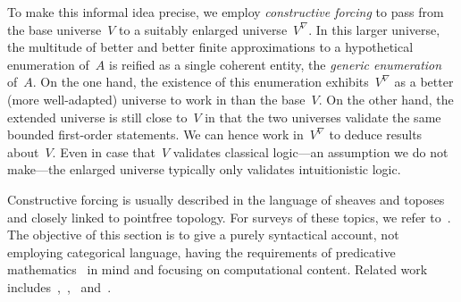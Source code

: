 \documentclass[com,11pt,crcready]{iosart2x}
\theoremstyle{definition}
\theoremstyle{plain}
\theoremstyle{remark}
\renewcommand{\_}{\mathpunct{.}\,}
\begin{document}
To make this informal idea precise, we employ \emph{constructive forcing} to
pass from the base universe~$V$ to a suitably enlarged universe~$V^\nabla$. In
this larger universe, the multitude of better and better finite approximations to a
hypothetical enumeration of~$A$ is reified as a single coherent entity, the
\emph{generic enumeration} of~$A$. On the one hand, the existence of this enumeration
exhibits~$V^\nabla$ as a better (more well-adapted) universe to work in than the
base~$V$. On the other hand, the extended universe is still close to~$V$ in that the two universes
validate the same bounded first-order statements. We can hence work in~$V^\nabla$ to
deduce results about~$V$. Even in case that~$V$ validates classical logic---an
assumption we do not make---the enlarged universe typically only validates
intuitionistic logic.

Constructive forcing is usually described in the language of sheaves and
toposes~\cite{palmgren:css,grayson:forcing,streicher:forcing,yamamoto:forcing}
and closely linked to pointfree topology. For surveys of these topics, we
refer to~\cite{blechschmidt:generalized-spaces,johnstone:art,johnstone:point,vickers:continuity,vickers:locales-toposes,belanger-marquis:pointless,johnstone:baby-elephant}.
The objective of this section is to give a purely syntactical account, not
employing categorical language, having the requirements of predicative
mathematics~\cite{maietti:au,vickers:sketches,crosilla:predicativity} in mind
and focusing
on computational content. Related work
includes~\cite[Section~2.4]{avigad:forcing},~\cite{coquand:goodman},~\cite[Section~2.3]{renardel-de-lavalette:bi}
and~\cite{sato:forcing}.
\end{document}
